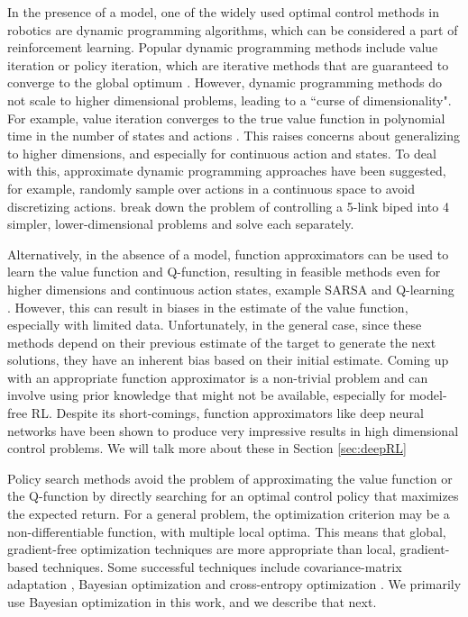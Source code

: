 In the presence of a model, one of the widely used optimal control methods in robotics are dynamic programming algorithms, which can be considered a part of reinforcement learning. Popular dynamic programming methods include value iteration or policy iteration, which are iterative methods that are guaranteed to converge to the global optimum \citep{bertsekas1995neuro}. However, dynamic programming methods do not scale to higher dimensional problems, leading to a ``curse of dimensionality". For example, value iteration converges to the true value function in polynomial time in the number of states and actions \citep{sutton1998reinforcement}. This raises concerns about generalizing to higher dimensions, and especially for continuous action and states. To deal with this, approximate dynamic programming approaches have been suggested, for example, \cite{atkeson2007randomly} randomly sample over actions in a continuous space to avoid discretizing actions. \cite{whitman2009control} break down the problem of controlling a 5-link biped into  4 simpler, lower-dimensional problems and solve each separately. 

Alternatively, in the absence of a model, function approximators can be used to learn the value function and Q-function, resulting in feasible methods even for higher dimensions and continuous action states, example SARSA and Q-learning  \citep{busoniu2010reinforcement}. However, this can result in biases in the estimate of the value function, especially with limited data. Unfortunately, in the general case, since these methods depend on their previous estimate of the target to generate the next solutions, they have an inherent bias based on their initial estimate. Coming up with an appropriate function approximator is a non-trivial problem and can involve using prior knowledge that might not be available, especially for model-free RL. Despite its short-comings, function approximators like deep neural networks have been shown to produce very impressive results in high dimensional control problems. We will talk more about these in Section \ref{sec:deepRL}

Policy search methods avoid the problem of approximating the value function or the Q-function by directly searching for an optimal control policy that maximizes the expected return. For a general problem, the optimization criterion may be a non-differentiable function, with multiple local optima. This means that global, gradient-free optimization techniques are more appropriate than local, gradient-based techniques. Some successful techniques include covariance-matrix adaptation \citep{hansen2006cma}, Bayesian optimization \citep{BOtutorial2016} and cross-entropy optimization \citep{rubinstein1999cross}. We primarily use Bayesian optimization in this work, and we describe that next.

